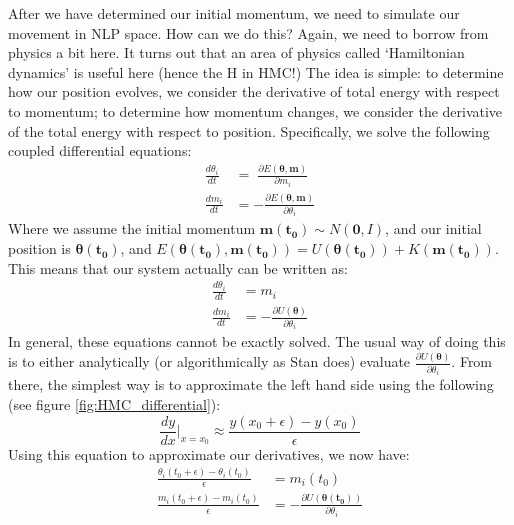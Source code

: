 \documentclass[11pt,fullpage]{book}
\begin{document}
After we have determined our initial momentum, we need to simulate our movement in NLP space. How can we do this? Again, we need to borrow from physics a bit here. It turns out that an area of physics called `Hamiltonian dynamics' is useful here (hence the H in HMC!) The idea is simple: to determine how our position evolves, we consider the derivative of total energy with respect to momentum; to determine how momentum changes, we consider the derivative of the total energy with respect to position. Specifically, we solve the following coupled differential equations:
%
\begin{align}
\frac{d \theta_i}{d t} &= \; \frac{\partial E(\boldsymbol{\theta},\boldsymbol{m})}{\partial m_i}\\
\frac{d m_i}{d t} &= - \frac{\partial E(\boldsymbol{\theta},\boldsymbol{m})}{\partial \theta_i}
\end{align}
%
Where we assume the initial momentum $\boldsymbol{m(t_0)} \sim N(\boldsymbol{0},I)$, and our initial position is $\boldsymbol{\theta(t_0)}$, and $E(\boldsymbol{\theta(t_0)},\boldsymbol{m(t_0)})=U(\boldsymbol{\theta(t_0)}) + K(\boldsymbol{m(t_0)})$. This means that our system actually can be written as:
%
\begin{align}
\frac{d \theta_i}{d t} &= m_i\\
\frac{d m_i}{d t} &= - \frac{\partial U(\boldsymbol{\theta})}{\partial \theta_i}
\end{align}
%
In general, these equations cannot be exactly solved. The usual way of doing this is to either analytically (or algorithmically as Stan does) evaluate $\frac{\partial U(\boldsymbol{\theta})}{\partial \theta_i}$. From there, the simplest way is to approximate the left hand side using the following (see figure \ref{fig:HMC_differential}):
%
\begin{equation}
\frac{d y}{d x}|_{x=x_0} \approx \frac{y(x_0+\epsilon) - y(x_0)}{\epsilon}
\end{equation}
%
Using this equation to approximate our derivatives, we now have:
%
\begin{align}
\frac{\theta_i(t_0+\epsilon) - \theta_i(t_0)}{\epsilon} &= m_i(t_0)\\
\frac{m_i(t_0+\epsilon) - m_i(t_0)}{\epsilon} &= - \frac{\partial U(\boldsymbol{\theta(t_0)})}{\partial \theta_i}
\end{align}
%
\end{document}
